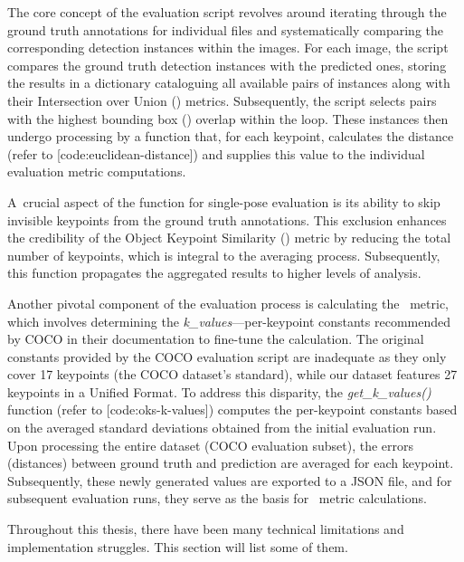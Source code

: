The core concept of the evaluation script revolves around iterating through the ground truth annotations for individual files and systematically comparing the corresponding detection instances within the images. For each image, the script compares the ground truth detection instances with the predicted ones, storing the results in a dictionary cataloguing all available pairs of instances along with their Intersection over Union (\IoU) metrics. Subsequently, the script selects pairs with the highest bounding box (\BBOX) overlap within the loop. These instances then undergo processing by a function that, for each keypoint, calculates the distance (refer to [code:euclidean-distance]) and supplies this value to the individual evaluation metric computations.


A~crucial aspect of the function for single-pose evaluation is its ability to skip invisible keypoints from the ground truth annotations. This exclusion enhances the credibility of the Object Keypoint Similarity (\OKS) metric by reducing the total number of keypoints, which is integral to the averaging process. Subsequently, this function propagates the aggregated results to higher levels of analysis.

Another pivotal component of the evaluation process is calculating the \OKS\ metric, which involves determining the {\it k_values}—per-keypoint constants recommended by COCO in their documentation to fine-tune the calculation. The original constants provided by the COCO evaluation script are inadequate as they only cover 17 keypoints (the COCO dataset's standard), while our dataset features 27 keypoints in a Unified Format. To address this disparity, the {\it get_k_values()} function (refer to [code:oks-k-values]) computes the per-keypoint constants based on the averaged standard deviations obtained from the initial evaluation run. Upon processing the entire dataset (COCO evaluation subset), the errors (distances) between ground truth and prediction are averaged for each keypoint. Subsequently, these newly generated values are exported to a JSON file, and for subsequent evaluation runs, they serve as the basis for \OKS\ metric calculations.


Throughout this thesis, there have been many technical limitations and implementation struggles. This section will list some of them.


